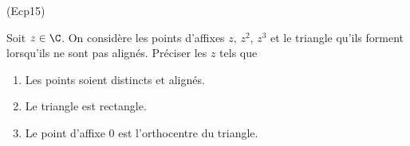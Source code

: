 \begin{tiny}(Ecp15)\end{tiny}
Soit $z\in \C$. On considère les points d'affixes $z$, $z^{2}$, $z^{3}$ et le triangle qu'ils forment lorsqu'ils ne sont pas alignés. Préciser les $z$ tels que
\begin{enumerate}
  \item Les points soient distincts et alignés.
  \item Le triangle est rectangle.
  \item Le point d'affixe $0$ est l'orthocentre du triangle.
\end{enumerate}
